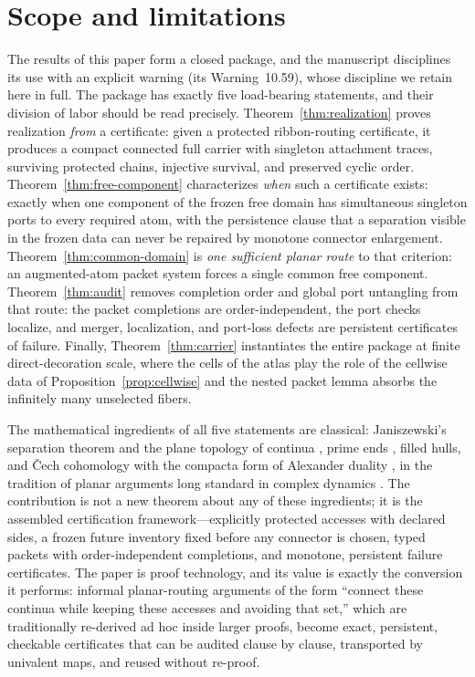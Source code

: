 \documentclass[11pt,reqno]{amsart}
\theoremstyle{definition}
\theoremstyle{remark}
\begin{document}


\section{Scope and limitations}\label{sec:scope}

The results of this paper form a closed package, and the manuscript
\cite{MWman} disciplines its use with an explicit warning (its
Warning~10.59), whose discipline we retain here in full.  The package has
exactly five load-bearing statements, and their division of labor should
be read precisely.  Theorem~\ref{thm:realization} proves realization
\emph{from} a certificate: given a protected ribbon-routing certificate,
it produces a compact connected full carrier with singleton attachment
traces, surviving protected chains, injective survival, and preserved
cyclic order.  Theorem~\ref{thm:free-component} characterizes \emph{when}
such a certificate exists: exactly when one component of the frozen free
domain has simultaneous singleton ports to every required atom, with the
persistence clause that a separation visible in the frozen data can never
be repaired by monotone connector enlargement.
Theorem~\ref{thm:common-domain} is \emph{one sufficient planar route} to
that criterion: an augmented-atom packet system forces a single common
free component.  Theorem~\ref{thm:audit} removes completion order and
global port untangling from that route: the packet completions are
order-independent, the port checks localize, and merger, localization,
and port-loss defects are persistent certificates of failure.  Finally,
Theorem~\ref{thm:carrier} instantiates the entire package at finite
direct-decoration scale, where the cells of the atlas play the role of
the cellwise data of Proposition~\ref{prop:cellwise} and the nested
packet lemma absorbs the infinitely many unselected fibers.

The mathematical ingredients of all five statements are classical:
Janiszewski's separation theorem and the plane topology of continua
\cite{New51,Why42}, prime ends \cite{Pom92}, filled hulls, and
\v{C}ech cohomology with the compacta form of Alexander duality
\cite{Hat02}, in the tradition of planar arguments long standard in
complex dynamics \cite{DH85}.  The contribution is not a new
theorem about any of these ingredients; it is the assembled
certification framework---explicitly protected accesses with declared
sides, a frozen future inventory fixed before any connector is chosen,
typed packets with order-independent completions, and monotone,
persistent failure certificates.  The paper is proof technology, and its
value is exactly the conversion it performs: informal planar-routing
arguments of the form ``connect these continua while keeping these
accesses and avoiding that set,'' which are traditionally re-derived ad
hoc inside larger proofs, become exact, persistent, checkable
certificates that can be audited clause by clause, transported by
univalent maps, and reused without re-proof.
\end{document}

